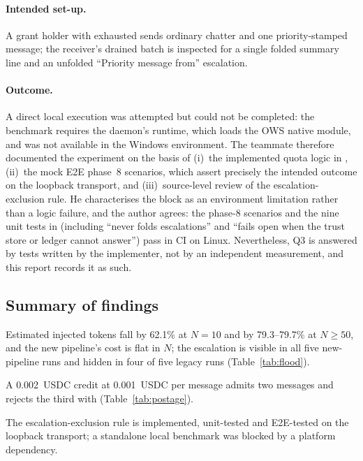 \paragraph{Intended set-up.}
A grant holder with  exhausted sends ordinary chatter and one
priority-stamped message; the receiver's drained batch is inspected for a single folded
summary line and an unfolded ``Priority message from'' escalation.

\paragraph{Outcome.}
A direct local execution was attempted but could not be completed: the benchmark requires
the daemon's runtime, which loads the OWS native module, and
 was not available in the Windows
environment. The teammate therefore documented the experiment on the basis of (i)~the
implemented quota logic in , (ii)~the mock E2E phase~8
scenarios, which assert precisely the intended outcome on the loopback transport, and
(iii)~source-level review of the escalation-exclusion rule. He characterises the block as
an environment limitation rather than a logic failure, and the author agrees: the phase-8
scenarios and the nine unit tests in  (including
``never folds escalations'' and ``fails open when the trust store or ledger cannot
answer'') pass in CI on Linux. Nevertheless, Q3 is answered by tests written by the
implementer, not by an independent measurement, and this report records it as such.

\subsection{Summary of findings}

\begin{description}[style=nextline,leftmargin=1.2em]
  \item[Finding 1 --- Coalescing bounds attention cost and protects escalations.]
        Estimated injected tokens fall by 62.1\% at $N=10$ and by 79.3--79.7\% at
        $N \ge 50$, and the new pipeline's cost is flat in $N$; the escalation is visible in
        all five new-pipeline runs and hidden in four of five legacy runs
        (Table~\ref{tab:flood}).
  \item[Finding 2 --- Postage creates an explicit economic boundary.]
        A 0.002~USDC credit at 0.001~USDC per message admits two messages and rejects the
        third with  (Table~\ref{tab:postage}).
  \item[Finding 3 --- Priority messages are preserved by design, not yet by measurement.]
        The escalation-exclusion rule is implemented, unit-tested and E2E-tested on the
        loopback transport; a standalone local benchmark was blocked by a platform
        dependency.
\end{description}
